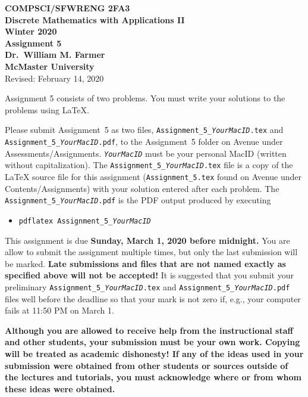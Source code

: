 \documentclass[11pt,fleqn]{article}
\begin{document}
\begin{center}

  {\large \textbf{COMPSCI/SFWRENG 2FA3}}\\[2mm]
  {\large \textbf{Discrete Mathematics with Applications II}}\\[2mm]
  {\large \textbf{Winter 2020}}\\[8mm]
  {\huge \textbf{Assignment 5}}\\[6mm]
  {\large \textbf{Dr.~William M. Farmer}}\\[2mm]
  {\large \textbf{McMaster University}}\\[6mm]
  {\large Revised: February 14, 2020}

\end{center}

\medskip

Assignment 5 consists of two problems.  You must write your solutions
to the problems using LaTeX.

Please submit Assignment~5 as two files,
\texttt{Assignment\_5\_\emph{YourMacID}.tex} and
\texttt{Assignment\_5\_\emph{YourMacID}.pdf}, to the Assignment~5
folder on Avenue under Assessments/Assignments.
\texttt{\emph{YourMacID}} must be your personal MacID (written without
capitalization).  The \texttt{Assignment\_5\_\emph{YourMacID}.tex}
file is a copy of the LaTeX source file for this assignment
(\texttt{Assignment\_5.tex} found on Avenue under
Contents/Assignments) with your solution entered after each problem.
The \texttt{Assignment\_5\_\emph{YourMacID}.pdf} is the PDF output
produced by executing

\begin{itemize}

  \item[] \texttt{pdflatex Assignment\_5\_\emph{YourMacID}}

\end{itemize}

This assignment is due \textbf{Sunday, March 1, 2020 before
  midnight.}  You are allow to submit the assignment multiple times,
but only the last submission will be marked.  \textbf{Late submissions
  and files that are not named exactly as specified above will not be
  accepted!}  It is suggested that you submit your preliminary
\texttt{Assignment\_5\_\emph{YourMacID}.tex} and
\texttt{Assignment\_5\_\emph{YourMacID}.pdf} files well before the
deadline so that your mark is not zero if, e.g., your computer fails
at 11:50 PM on March 1.

\textbf{Although you are allowed to receive help from the
  instructional staff and other students, your submission must be your
  own work.  Copying will be treated as academic dishonesty! If any of
  the ideas used in your submission were obtained from other students
  or sources outside of the lectures and tutorials, you must
  acknowledge where or from whom these ideas were obtained.}
\end{document}
